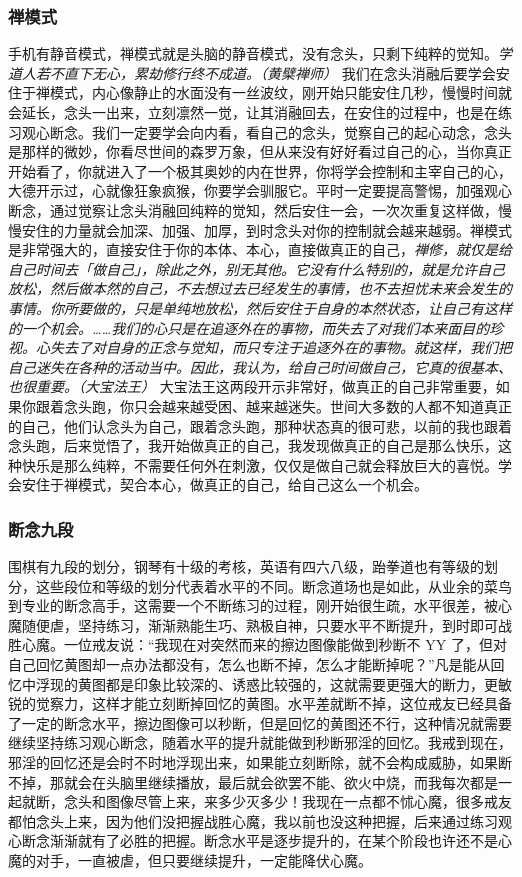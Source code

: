 \subsubsection{禅模式}

手机有静音模式，禅模式就是头脑的静音模式，没有念头，只剩下纯粹的觉知。\textit{学道人若不直下无心，累劫修行终不成道。（黄檗禅师）} 我们在念头消融后要学会安住于禅模式，内心像静止的水面没有一丝波纹，刚开始只能安住几秒，慢慢时间就会延长，念头一出来，立刻凛然一觉，让其消融回去，在安住的过程中，也是在练习观心断念。我们一定要学会向内看，看自己的念头，觉察自己的起心动念，念头是那样的微妙，你看尽世间的森罗万象，但从来没有好好看过自己的心，当你真正开始看了，你就进入了一个极其奥妙的内在世界，你将学会控制和主宰自己的心，大德开示过，心就像狂象疯猴，你要学会驯服它。平时一定要提高警惕，加强观心断念，通过觉察让念头消融回纯粹的觉知，然后安住一会，一次次重复这样做，慢慢安住的力量就会加深、加强、加厚，到时念头对你的控制就会越来越弱。禅模式是非常强大的，直接安住于你的本体、本心，直接做真正的自己，\textit{禅修，就仅是给自己时间去「做自己」，除此之外，别无其他。它没有什么特别的，就是允许自己放松，然后做本然的自己，不去想过去已经发生的事情，也不去担忧未来会发生的事情。你所要做的，只是单纯地放松，然后安住于自身的本然状态，让自己有这样的一个机会。……我们的心只是在追逐外在的事物，而失去了对我们本来面目的珍视。心失去了对自身的正念与觉知，而只专注于追逐外在的事物。就这样，我们把自己迷失在各种的活动当中。因此，我认为，给自己时间做自己，它真的很基本、也很重要。（大宝法王）} 大宝法王这两段开示非常好，做真正的自己非常重要，如果你跟着念头跑，你只会越来越受困、越来越迷失。世间大多数的人都不知道真正的自己，他们认念头为自己，跟着念头跑，那种状态真的很可悲，以前的我也跟着念头跑，后来觉悟了，我开始做真正的自己，我发现做真正的自己是那么快乐，这种快乐是那么纯粹，不需要任何外在刺激，仅仅是做自己就会释放巨大的喜悦。学会安住于禅模式，契合本心，做真正的自己，给自己这么一个机会。

\subsubsection{断念九段}

围棋有九段的划分，钢琴有十级的考核，英语有四六八级，跆拳道也有等级的划分，这些段位和等级的划分代表着水平的不同。断念道场也是如此，从业余的菜鸟到专业的断念高手，这需要一个不断练习的过程，刚开始很生疏，水平很差，被心魔随便虐，坚持练习，渐渐熟能生巧、熟极自神，只要水平不断提升，到时即可战胜心魔。一位戒友说：“我现在对突然而来的擦边图像能做到秒断不 YY 了，但对自己回忆黄图却一点办法都没有，怎么也断不掉，怎么才能断掉呢？”凡是能从回忆中浮现的黄图都是印象比较深的、诱惑比较强的，这就需要更强大的断力，更敏锐的觉察力，这样才能立刻断掉回忆的黄图。水平差就断不掉，这位戒友已经具备了一定的断念水平，擦边图像可以秒断，但是回忆的黄图还不行，这种情况就需要继续坚持练习观心断念，随着水平的提升就能做到秒断邪淫的回忆。我戒到现在，邪淫的回忆还是会时不时地浮现出来，如果能立刻断除，就不会构成威胁，如果断不掉，那就会在头脑里继续播放，最后就会欲罢不能、欲火中烧，而我每次都是一起就断，念头和图像尽管上来，来多少灭多少！我现在一点都不怵心魔，很多戒友都怕念头上来，因为他们没把握战胜心魔，我以前也没这种把握，后来通过练习观心断念渐渐就有了必胜的把握。断念水平是逐步提升的，在某个阶段也许还不是心魔的对手，一直被虐，但只要继续提升，一定能降伏心魔。

